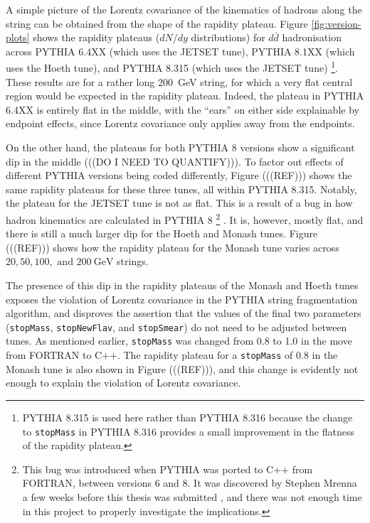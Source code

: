 \documentclass[12pt,a4paper]{report}
\begin{document}
A simple picture of the Lorentz covariance of the kinematics of hadrons along the string can be obtained from the shape of the rapidity plateau. Figure \ref{fig:version-plots} shows the rapidity plateaus ($dN/dy$ distributions) for $d\bar{d}$ hadronisation across PYTHIA 6.4XX (which uses the JETSET tune), PYTHIA 8.1XX (which uses the Hoeth tune), and PYTHIA 8.315 (which uses the JETSET tune) \footnote{PYTHIA 8.315 is used here rather than PYTHIA 8.316 because the change to \texttt{stopMass} in PYTHIA 8.316 provides a small improvement in the flatness of the rapidity plateau.}. These results are for a rather long \qty{200}{\giga\electronvolt} string, for which a very flat central region would be expected in the rapidity plateau. Indeed, the plateau in PYTHIA 6.4XX is entirely flat in the middle, with the ``ears'' on either side explainable by endpoint effects, since Lorentz covariance only applies away from the endpoints.

On the other hand, the plateaus for both PYTHIA 8 versions show a significant dip in the middle (((DO I NEED TO QUANTIFY))). To factor out effects of different PYTHIA versions being coded differently, Figure (((REF))) shows the same rapidity plateaus for these three tunes, all within PYTHIA 8.315. Notably, the plateau for the JETSET tune is not as flat. This is a result of a bug in how hadron kinematics are calculated in PYTHIA 8 \footnote{This bug was introduced when PYTHIA was ported to C++ from FORTRAN, between versions 6 and 8. It was discovered by Stephen Mrenna a few weeks before this thesis was submitted \cite{steve}, and there was not enough time in this project to properly investigate the implications.} \cite{steve}. It is, however, mostly flat, and there is still a much larger dip for the Hoeth and Monash tunes. Figure (((REF))) shows how the rapidity plateau for the Monash tune varies across $20, 50, 100,\text{ and } \qty{200}{\giga\electronvolt}$ strings.

The presence of this dip in the rapidity plateaus of the Monash and Hoeth tunes exposes the violation of Lorentz covariance in the PYTHIA string fragmentation algorithm, and disproves the assertion that the values of the final two parameters (\texttt{stopMass}, \texttt{stopNewFlav}, and \texttt{stopSmear}) do not need to be adjusted between tunes. As mentioned earlier, \texttt{stopMass} was changed from 0.8 to 1.0 in the move from FORTRAN to C++. The rapidity plateau for a \texttt{stopMass} of 0.8 in the Monash tune is also shown in Figure (((REF))), and this change is evidently not enough to explain the violation of Lorentz covariance.
\end{document}
